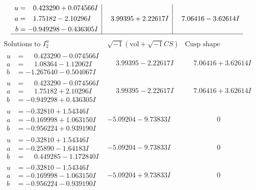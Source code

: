 \documentclass[1p]{elsarticle_modified}
\theoremstyle{definition}
\newcommand{\I}{\sqrt{-1}}
\begin{document}
$$\begin{array}{c|c|c}
\begin{aligned}
u &= \phantom{-}0.423290 + 0.074566 I \\
a &= \phantom{-}1.75182 - 2.10296 I \\
b &= -0.949298 - 0.436305 I\end{aligned}
 & \phantom{-}3.99395 + 2.22617 I & \phantom{-}7.06416 - 3.62614 I\\
 \hline 
 \end{array}$$\newpage$$\begin{array}{c|c|c}  
\text{Solutions to }I^u_{2}& \I (\text{vol} + \sqrt{-1}CS) & \text{Cusp shape}\\
 \hline 
\begin{aligned}
u &= \phantom{-}0.423290 - 0.074566 I \\
a &= \phantom{-}1.08364 - 1.12062 I \\
b &= -1.267640 - 0.504067 I\end{aligned}
 & \phantom{-}3.99395 - 2.22617 I & \phantom{-}7.06416 + 3.62614 I \\ \hline\begin{aligned}
u &= \phantom{-}0.423290 - 0.074566 I \\
a &= \phantom{-}1.75182 + 2.10296 I \\
b &= -0.949298 + 0.436305 I\end{aligned}
 & \phantom{-}3.99395 - 2.22617 I & \phantom{-}7.06416 + 3.62614 I \\ \hline\begin{aligned}
u &= -0.32810 + 1.54346 I \\
a &= -0.169998 + 1.063150 I \\
b &= -0.956224 + 0.939190 I\end{aligned}
 & -5.09204 - 9.73833 I & \phantom{-0.000000 } 0 \\ \hline\begin{aligned}
u &= -0.32810 + 1.54346 I \\
a &= -0.25890 - 1.64183 I \\
b &= \phantom{-}0.449285 - 1.172840 I\end{aligned}
 & -5.09204 - 9.73833 I & \phantom{-0.000000 } 0 \\ \hline\begin{aligned}
u &= -0.32810 - 1.54346 I \\
a &= -0.169998 - 1.063150 I \\
b &= -0.956224 - 0.939190 I\end{aligned}
 & -5.09204 + 9.73833 I & \phantom{-0.000000 } 0 \\ \hline\begin{aligned}

\end{aligned}
\end{array}$$
\end{document}
